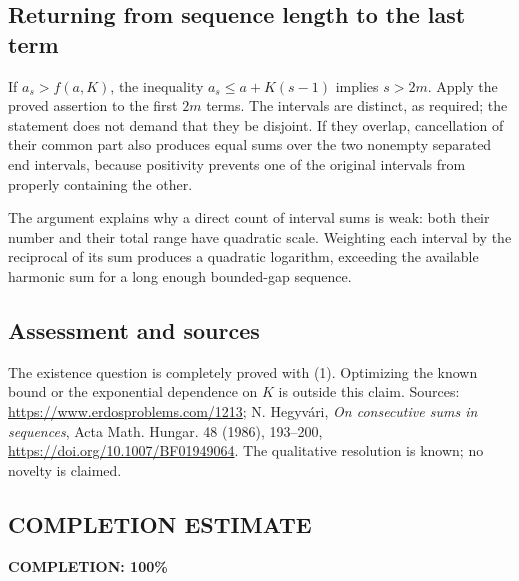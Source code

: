 \subsection*{Returning from sequence length to the last term}
If $a_s>f(a,K)$, the inequality $a_s\le a+K(s-1)$ implies $s>2m$. Apply the proved assertion to the first $2m$ terms. The intervals are distinct, as required; the statement does not demand that they be disjoint. If they overlap, cancellation of their common part also produces equal sums over the two nonempty separated end intervals, because positivity prevents one of the original intervals from properly containing the other.

The argument explains why a direct count of interval sums is weak: both their number and their total range have quadratic scale. Weighting each interval by the reciprocal of its sum produces a quadratic logarithm, exceeding the available harmonic sum for a long enough bounded-gap sequence.

\subsection*{Assessment and sources}
The existence question is completely proved with (1). Optimizing the known bound or the exponential dependence on $K$ is outside this claim. Sources: \url{https://www.erdosproblems.com/1213}; N. Hegyv\'ari, \emph{On consecutive sums in sequences}, Acta Math. Hungar. 48 (1986), 193--200, \url{https://doi.org/10.1007/BF01949064}. The qualitative resolution is known; no novelty is claimed.
\subsection*{COMPLETION ESTIMATE}
\textbf{COMPLETION: 100\%}
